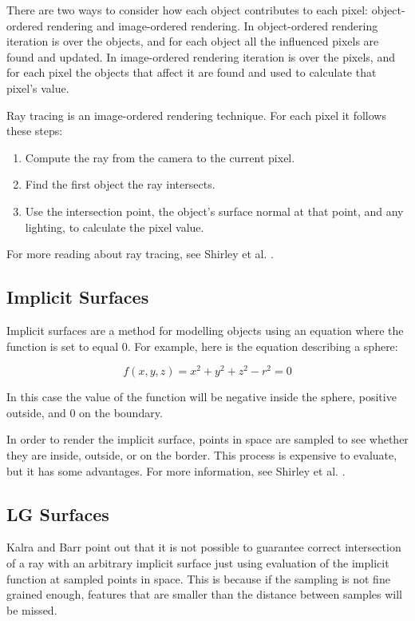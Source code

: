 \documentclass[conference]{acmsiggraph}
\begin{document}
There are two ways to consider how each object contributes to each 
pixel: object-ordered rendering and image-ordered rendering.  In
object-ordered rendering iteration is over the objects, and for
each object all the influenced pixels are found and updated.  In
image-ordered rendering iteration is over the pixels, and for each
pixel the objects that affect it are found and used to calculate
that pixel's value.

Ray tracing is an image-ordered rendering technique.  For each pixel
it follows these steps:
\begin{enumerate}
	\item Compute the ray from the camera to the current pixel.
	\item Find the first object the ray intersects.
	\item Use the intersection point, the object's surface normal at that
	point, and any lighting, to calculate the pixel value.
\end{enumerate}

For more reading about ray tracing, see Shirley et al. \cite{Shirley}.

\subsection{Implicit Surfaces}

Implicit surfaces are a method for modelling objects using an equation
where the function is set to equal 0.  For example, here is the 
equation describing a sphere:

\begin{equation}
f(x, y, z) = x^2 + y^2 + z^2 - r^2 = 0
\end{equation}

In this case the value of the function will be negative inside the 
sphere, positive outside, and 0 on the boundary.

In order to render the implicit surface, points in space are sampled
to see whether they are inside, outside, or on the border.  This process
is expensive to evaluate, but it has some advantages.  For more information,
see Shirley et al. \cite{Shirley}.

\subsection{LG Surfaces}
\label{sec:LGSurfaces}

Kalra and Barr \cite{KalraBarr1989} point out that it is not possible to
guarantee correct intersection of a ray with an arbitrary implicit surface
just using evaluation of the implicit function at sampled points in space.
This is because if the sampling is not fine grained enough, features that
are smaller than the distance between samples will be missed.
\end{document}
